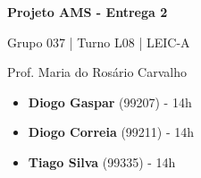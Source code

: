 \documentclass[12pt,a4paper]{article}
\begin{document}
\begin{titlepage}
  \begin{center}
    \vspace*{5cm}

    \Huge
    \textbf{Projeto AMS - Entrega 2}

    \vspace{0.5cm}
    \LARGE
    Grupo 037 | Turno L08 | LEIC-A

    \vspace{0.5cm}
    \large
    Prof. Maria do Rosário Carvalho

    \vfill
  \end{center}
  \large
  \begin{itemize}
    \item[] \textbf{Diogo Gaspar} (99207) - 14h
    \item[] \textbf{Diogo Correia} (99211) - 14h
    \item[] \textbf{Tiago Silva} (99335) - 14h
  \end{itemize}
\end{titlepage}
\end{document}
